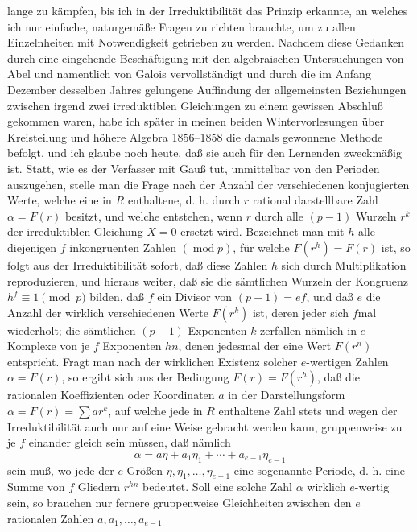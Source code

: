 \documentclass[11pt]{article}
\newcommand{\origpage}[1]{\par\vspace{0.25em}\noindent{\footnotesize\itshape [Gedruckte Seite #1]}\par\vspace{0.25em}}
\begin{document}
\origpage{415}
lange zu kämpfen, bis ich in der Irreduktibilität das Prinzip erkannte, an welches ich nur einfache, naturgemäße Fragen zu richten brauchte, um zu allen Einzelnheiten mit Notwendigkeit getrieben zu werden. Nachdem diese Gedanken durch eine eingehende Beschäftigung mit den algebraischen Untersuchungen von Abel und namentlich von Galois vervollständigt und durch die im Anfang Dezember desselben Jahres gelungene Auffindung der allgemeinsten Beziehungen zwischen irgend zwei irreduktiblen Gleichungen zu einem gewissen Abschluß gekommen waren, habe ich später in meinen beiden Wintervorlesungen über Kreisteilung und höhere Algebra 1856--1858 die damals gewonnene Methode befolgt, und ich glaube noch heute, daß sie auch für den Lernenden zweckmäßig ist. Statt, wie es der Verfasser mit Gauß tut, unmittelbar von den Perioden auszugehen, stelle man die Frage nach der Anzahl der verschiedenen konjugierten Werte, welche eine in $R$ enthaltene, d. h. durch $r$ rational darstellbare Zahl $\alpha=F(r)$ besitzt, und welche entstehen, wenn $r$ durch alle $(p-1)$ Wurzeln $r^k$ der irreduktiblen Gleichung $X=0$ ersetzt wird. Bezeichnet man mit $h$ alle diejenigen $f$ inkongruenten Zahlen $(\operatorname{mod} p)$, für welche $F(r^h)=F(r)$ ist, so folgt aus der Irreduktibilität sofort, daß diese Zahlen $h$ sich durch Multiplikation reproduzieren, und hieraus weiter, daß sie die sämtlichen Wurzeln der Kongruenz $h^f\equiv1\pmod p$ bilden, daß $f$ ein Divisor von $(p-1)=ef$, und daß $e$ die Anzahl der wirklich verschiedenen Werte $F(r^k)$ ist, deren jeder sich $f$mal wiederholt; die sämtlichen $(p-1)$ Exponenten $k$ zerfallen nämlich in $e$ Komplexe von je $f$ Exponenten $hn$, denen jedesmal der eine Wert $F(r^n)$ entspricht. Fragt man nach der wirklichen Existenz solcher $e$-wertigen Zahlen $\alpha=F(r)$, so ergibt sich aus der Bedingung $F(r)=F(r^h)$, daß die rationalen Koeffizienten oder Koordinaten $a$ in der Darstellungsform $\alpha=F(r)=\sum ar^k$, auf welche jede in $R$ enthaltene Zahl stets und wegen der Irreduktibilität auch nur auf eine Weise gebracht werden kann, gruppenweise zu je $f$ einander gleich sein müssen, daß nämlich
\[
 \alpha=a\eta+a_1\eta_1+\cdots+a_{e-1}\eta_{e-1}
\]
sein muß, wo jede der $e$ Größen $\eta,\eta_1,\ldots,\eta_{e-1}$ eine sogenannte Periode, d. h. eine Summe von $f$ Gliedern $r^{h n}$ bedeutet. Soll eine solche Zahl $\alpha$ wirklich $e$-wertig sein, so brauchen nur fernere gruppenweise Gleichheiten zwischen den $e$ rationalen Zahlen $a,a_1,\ldots,a_{e-1}$
\end{document}
